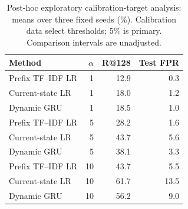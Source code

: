 \begin{table}[t]
\centering\footnotesize
\caption{Post-hoc exploratory calibration-target analysis: means over three fixed seeds (\%). Calibration data select thresholds; 5\% is primary. Comparison intervals are unadjusted.}\label{tab:review_sensitivity}
\begin{tabular}{lrrr}\toprule
Method & $\alpha$ & R@128 & Test FPR \\
\midrule
Prefix TF--IDF LR & 1 & 12.9 & 0.3 \\
Current-state LR & 1 & 18.0 & 1.2 \\
Dynamic GRU & 1 & 18.5 & 1.0 \\
Prefix TF--IDF LR & 5 & 28.2 & 1.6 \\
Current-state LR & 5 & 43.7 & 5.6 \\
Dynamic GRU & 5 & 38.1 & 3.3 \\
Prefix TF--IDF LR & 10 & 43.7 & 5.5 \\
Current-state LR & 10 & 61.7 & 13.5 \\
Dynamic GRU & 10 & 56.2 & 9.0 \\
\bottomrule\end{tabular}
\end{table}
